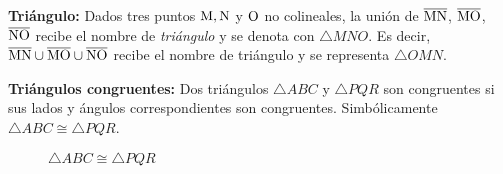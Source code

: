\begin{definition}{\textbf{Triángulo:}}
    Dados tres puntos $\rm M,N$ y $\rm O$ no colineales, la unión de $\overline{\rm MN}$, $\overline{\rm MO}$, $\overline{\rm NO}$ recibe el nombre de \textit{triángulo} y se denota con $\triangle{MNO}$. Es decir, $\overline{\rm MN} \cup \overline{\rm MO} \cup \overline{\rm NO}$ recibe el nombre de triángulo y se representa $\triangle{OMN}$.

    \begin{figure}[!h]
        \centering
        
        \label{fig:triangle}
    \end{figure}
    
\end{definition}

\begin{definition}{\textbf{Triángulos congruentes:}}
    Dos triángulos $\triangle{ABC}$ y $\triangle{PQR}$ son congruentes si sus lados y ángulos correspondientes son congruentes. Simbólicamente $\triangle{ABC} \cong \triangle{PQR}$.

    \begin{figure}[h!]

        \centering

        \begin{subfigure}[b]{.5\textwidth}
            \centering
            
            \label{fig:triag-congruence-1}
        \end{subfigure}%
        \begin{subfigure}[b]{.5\textwidth}
            \centering
            
            \label{fig:triag-congruence-2}
        \end{subfigure}

        \centering
        \caption{$\triangle{ABC} \cong \triangle{PQR}$}
        \label{fig:triang-congruence}
        
    \end{figure}    
    
\end{definition}

